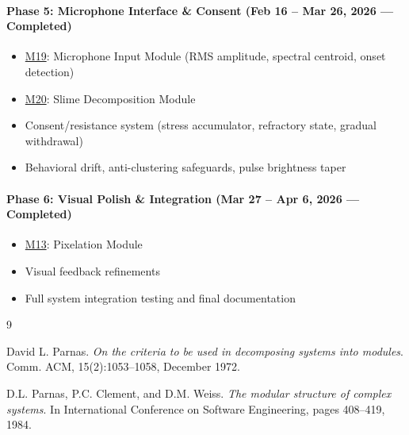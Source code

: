 \documentclass[12pt, titlepage]{article}
\begin{document}
\paragraph{Phase 5: Microphone Interface \& Consent (Feb 16 -- Mar 26, 2026 --- Completed)}
\begin{itemize}
\item \hyperref[M19]{M19}: Microphone Input Module (RMS amplitude, spectral centroid, onset detection)
\item \hyperref[M20]{M20}: Slime Decomposition Module
\item Consent/resistance system (stress accumulator, refractory state, gradual withdrawal)
\item Behavioral drift, anti-clustering safeguards, pulse brightness taper
\end{itemize}

\paragraph{Phase 6: Visual Polish \& Integration (Mar 27 -- Apr 6, 2026 --- Completed)}
\begin{itemize}
\item \hyperref[M13]{M13}: Pixelation Module
\item Visual feedback refinements
\item Full system integration testing and final documentation
\end{itemize}


\begin{thebibliography}{9}

David L. Parnas.
\textit{On the criteria to be used in decomposing systems into modules}.
Comm. ACM, 15(2):1053--1058, December 1972.

D.L. Parnas, P.C. Clement, and D.M. Weiss.
\textit{The modular structure of complex systems}.
In International Conference on Software Engineering, pages 408--419, 1984.

\end{thebibliography}
\end{document}
